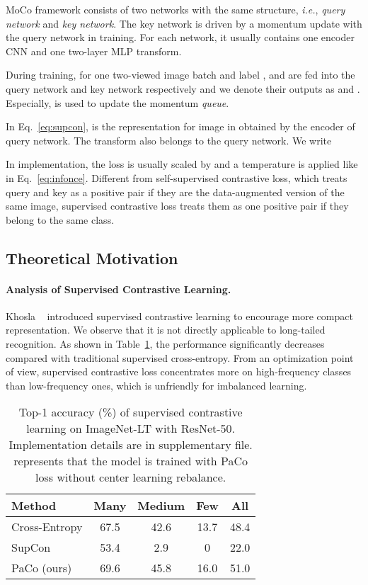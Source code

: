 \documentclass[10pt,twocolumn,letterpaper]{article}
\begin{document}
MoCo framework \cite{DBLP:conf/cvpr/He0WXG20, DBLP:journals/corr/abs-2003-04297} consists of two networks with the same structure, {\it i.e.}, { \it query network} and {\it key network}. The key network is driven by a momentum update with the query network in training. For each network, it usually contains one encoder CNN and one two-layer MLP transform.

During training, for one two-viewed image batch  and label ,  and  are fed into the {query network} and {key network} respectively and we denote their outputs as  and .
Especially,  is used to update the momentum {\it queue}. 

In Eq.~\eqref{eq:supcon},  is the representation for image  in  obtained by the encoder of {query network}. The transform  also belongs to the {query network}. We write


In implementation, the loss is usually scaled by  and a temperature  is applied like in Eq.~\eqref{eq:infonce}.
Different from self-supervised contrastive loss, which treats query and key as a positive pair if they are the data-augmented version of the same image, supervised contrastive loss treats them as one positive pair if they belong to the same class. 

\subsection{Theoretical Motivation}
\paragraph{Analysis of Supervised Contrastive Learning.}
Khosla \etal~\cite{DBLP:conf/nips/KhoslaTWSTIMLK20} introduced supervised contrastive learning to encourage more compact representation. We observe that it is not directly applicable to long-tailed recognition.
As shown in Table~\ref{tab:motivation}, the performance significantly decreases compared with traditional supervised cross-entropy.
From an optimization point of view, supervised contrastive loss concentrates more on high-frequency classes than low-frequency ones, which is unfriendly for imbalanced learning.

\begin{table}[tb!]
	\small
	\centering
	\caption{Top-1 accuracy (\%) of supervised contrastive learning on ImageNet-LT with ResNet-50. Implementation details are in supplementary file. \dag represents that the model is trained with PaCo loss without center learning rebalance.}
	\vspace{0pt}
	{
		\begin{tabular}{lcccc}
			\toprule
			Method &Many &Medium &Few &All \\
			\midrule
			Cross-Entropy &67.5 &42.6 &13.7 &48.4\\
			SupCon        &53.4 &2.9 &0 &22.0\\
			PaCo (ours) \dag    &69.6 &45.8 &16.0 &51.0\\
			\bottomrule
		\end{tabular}
	}
	\label{tab:motivation}
\end{table}
\end{document}

